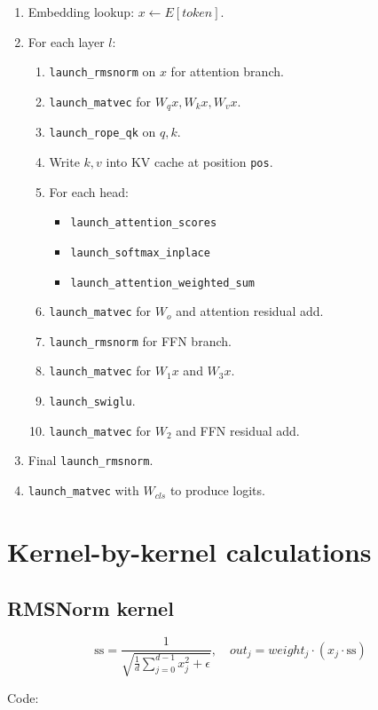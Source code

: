 \documentclass[11pt]{article}
\begin{document}
\begin{enumerate}[leftmargin=*]
  \item Embedding lookup: \(x \leftarrow E[token]\).
  \item For each layer \(l\):
  \begin{enumerate}
    \item \texttt{launch\_rmsnorm} on \(x\) for attention branch.
    \item \texttt{launch\_matvec} for \(W_qx, W_kx, W_vx\).
    \item \texttt{launch\_rope\_qk} on \(q, k\).
    \item Write \(k,v\) into KV cache at position \texttt{pos}.
    \item For each head:
      \begin{itemize}
        \item \texttt{launch\_attention\_scores}
        \item \texttt{launch\_softmax\_inplace}
        \item \texttt{launch\_attention\_weighted\_sum}
      \end{itemize}
    \item \texttt{launch\_matvec} for \(W_o\) and attention residual add.
    \item \texttt{launch\_rmsnorm} for FFN branch.
    \item \texttt{launch\_matvec} for \(W_1x\) and \(W_3x\).
    \item \texttt{launch\_swiglu}.
    \item \texttt{launch\_matvec} for \(W_2\) and FFN residual add.
  \end{enumerate}
  \item Final \texttt{launch\_rmsnorm}.
  \item \texttt{launch\_matvec} with \(W_{cls}\) to produce logits.
\end{enumerate}

\section{Kernel-by-kernel calculations}
\subsection{RMSNorm kernel}
\[
\text{ss} = \frac{1}{\sqrt{\frac{1}{d}\sum_{j=0}^{d-1}x_j^2 + \epsilon}},
\quad
out_j = weight_j \cdot (x_j \cdot \text{ss})
\]

Code:

\end{document}
